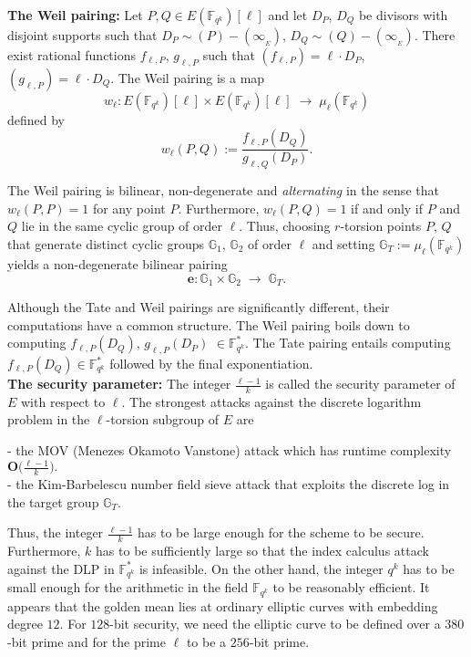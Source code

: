 \documentclass[11pt, lettersize, notitlepage, leqno, footskip=0.6cm]{article}
\newcommand{\bF}{\mathbb F}
\newcommand{\bFqk}{\mathbb{F}_{q^k}}
\newcommand{\bG}{\mathbb{G}}
\newcommand{\lra}{\longrightarrow}
\newcommand{\mb}{\mathbb}
\newcommand{\mbf}{\mathbf}
\newcommand{\e}{\mathbf{e}}
\newcommand{\vs}{\vspace{-2mm}}
\newcommand{\noin}{\noindent}
\numberwithin{equation}{section}
\begin{document}
\noin \textbf{The Weil pairing:} Let $P, Q \in E(\bFqk)[\ell]$ and let $D_P$, $D_Q$ be divisors with disjoint supports such that $D_P \sim (P) - (\infty_{_E}) $, $D_Q \sim (Q) - (\infty_{_E}) $. There exist rational functions $f_{\ell,P}$, $g_{\ell,P}$ such that $(f_{\ell,P}) = \ell \cdot D_P$, $(g_{\ell,P}) = \ell \cdot D_Q$. The Weil pairing is a map \vs $$w_{\ell}: E(\bFqk)[\ell]\times E(\bFqk)[\ell]\;\lra \; \mu_{\ell}(\bFqk) $$ defined by \vs $$w_{\ell}(P,Q):= \frac{f_{\ell,P}(D_Q)}{g_{\ell,Q}(D_P)}. $$

The Weil pairing is bilinear, non-degenerate and \textit{alternating} in the sense that $w_{\ell}(P,P) = 1$ for any point $P$. Furthermore, $w_{\ell}(P,Q) = 1$ if and only if $P$ and $Q$ lie in the same cyclic group of order $\ell$. Thus, choosing $r$-torsion points $P$, $Q$ that generate distinct cyclic groups $\mb{G}_1$, $\mb{G}_2$ of order $\ell$ and setting $\mb{G}_T:= \mu_{\ell}(\bFqk)$ yields a non-degenerate bilinear pairing \vs $$\e: \mb{G}_1\times\mb{G}_2 \;\lra\; \mb{G}_T . $$    

Although the Tate and Weil pairings are significantly different, their computations have a common structure. The Weil pairing boils down to computing $f_{\ell,P}(D_Q)$, $g_{\ell,P}(D_P)$ $\in \bFqk^*$. The Tate pairing entails computing $f_{\ell,P}(D_Q)\in \bFqk^*$ followed by the final exponentiation.\\


\noin \textbf{The security parameter:} The integer $\frac{\ell-1}{k}$ is called the security parameter of $E$ with respect to $\ell$. The strongest attacks against the discrete logarithm problem in the $\ell$-torsion subgroup of $E$ are 

\noin - the MOV (Menezes Okamoto Vanstone) attack which has runtime complexity $\mbf{O}\big(\frac{\ell-1}{k}).$ \\
- the Kim-Barbelescu number field sieve attack that exploits the discrete log in the target group $\bG_T$.

Thus, the integer $\frac{\ell-1}{k}$ has to be large enough for the scheme to be secure. Furthermore, $k$ has to be sufficiently large so that the index calculus attack against the DLP in $\bFqk^*$ is infeasible. On the other hand, the integer $q^k$ has to be small enough for the arithmetic in the field $\bF _{q^k}$ to be reasonably efficient. It appears that the golden mean  lies at ordinary elliptic curves with embedding degree $12$. For $128$-bit security, we need the elliptic curve to be defined over a $380$-bit prime and for the prime $\ell$ to be a $256$-bit prime.  
\end{document}
